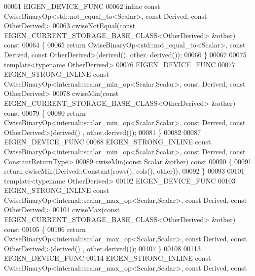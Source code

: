 \begin{DoxyCode}
00061 EIGEN\_DEVICE\_FUNC
00062 \textcolor{keyword}{inline} \textcolor{keyword}{const} CwiseBinaryOp<std::not\_equal\_to<Scalar>, \textcolor{keyword}{const} Derived, \textcolor{keyword}{const} OtherDerived>
00063 cwiseNotEqual(\textcolor{keyword}{const} EIGEN\_CURRENT\_STORAGE\_BASE\_CLASS<OtherDerived> &other)\textcolor{keyword}{ const}
00064 \textcolor{keyword}{}\{
00065   \textcolor{keywordflow}{return} CwiseBinaryOp<std::not\_equal\_to<Scalar>, \textcolor{keyword}{const} Derived, \textcolor{keyword}{const} OtherDerived>(derived(), other.
      derived());
00066 \}
00067 
00075 \textcolor{keyword}{template}<\textcolor{keyword}{typename} OtherDerived>
00076 EIGEN\_DEVICE\_FUNC
00077 EIGEN\_STRONG\_INLINE \textcolor{keyword}{const} CwiseBinaryOp<internal::scalar\_min\_op<Scalar,Scalar>, \textcolor{keyword}{const} Derived, \textcolor{keyword}{const} 
      OtherDerived>
00078 cwiseMin(\textcolor{keyword}{const} EIGEN\_CURRENT\_STORAGE\_BASE\_CLASS<OtherDerived> &other)\textcolor{keyword}{ const}
00079 \textcolor{keyword}{}\{
00080   \textcolor{keywordflow}{return} CwiseBinaryOp<internal::scalar\_min\_op<Scalar,Scalar>, \textcolor{keyword}{const} Derived, \textcolor{keyword}{const} OtherDerived>(derived()
      , other.derived());
00081 \}
00082 
00087 EIGEN\_DEVICE\_FUNC
00088 EIGEN\_STRONG\_INLINE \textcolor{keyword}{const} CwiseBinaryOp<internal::scalar\_min\_op<Scalar,Scalar>, \textcolor{keyword}{const} Derived, \textcolor{keyword}{const} 
      ConstantReturnType>
00089 cwiseMin(\textcolor{keyword}{const} Scalar &other)\textcolor{keyword}{ const}
00090 \textcolor{keyword}{}\{
00091   \textcolor{keywordflow}{return} cwiseMin(Derived::Constant(rows(), cols(), other));
00092 \}
00093 
00101 \textcolor{keyword}{template}<\textcolor{keyword}{typename} OtherDerived>
00102 EIGEN\_DEVICE\_FUNC
00103 EIGEN\_STRONG\_INLINE \textcolor{keyword}{const} CwiseBinaryOp<internal::scalar\_max\_op<Scalar,Scalar>, \textcolor{keyword}{const} Derived, \textcolor{keyword}{const} 
      OtherDerived>
00104 cwiseMax(\textcolor{keyword}{const} EIGEN\_CURRENT\_STORAGE\_BASE\_CLASS<OtherDerived> &other)\textcolor{keyword}{ const}
00105 \textcolor{keyword}{}\{
00106   \textcolor{keywordflow}{return} CwiseBinaryOp<internal::scalar\_max\_op<Scalar,Scalar>, \textcolor{keyword}{const} Derived, \textcolor{keyword}{const} OtherDerived>(derived()
      , other.derived());
00107 \}
00108 
00113 EIGEN\_DEVICE\_FUNC
00114 EIGEN\_STRONG\_INLINE \textcolor{keyword}{const} CwiseBinaryOp<internal::scalar\_max\_op<Scalar,Scalar>, \textcolor{keyword}{const} Derived, \textcolor{keyword}{const} 

\end{DoxyCode}
